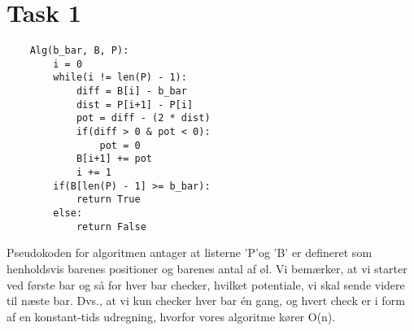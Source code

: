 \section{Task 1}
\begin{lstlisting}
	Alg(b_bar, B, P):
		i = 0
		while(i != len(P) - 1):
			diff = B[i] - b_bar
			dist = P[i+1] - P[i]
			pot = diff - (2 * dist)
			if(diff > 0 & pot < 0):
				pot = 0
			B[i+1] += pot
			i += 1
		if(B[len(P) - 1] >= b_bar):
			return True
		else:
			return False
\end{lstlisting}
Pseudokoden for algoritmen antager at listerne 'P'og 'B' er defineret som henholdsvis barenes positioner og barenes antal af øl.
Vi bemærker, at vi starter ved første bar og så for hver bar checker, hvilket potentiale, vi skal sende videre til næste bar. Dvs., at vi kun checker hver bar én gang, og hvert check er i form af en konstant-tids udregning, hvorfor vores algoritme kører O(n).

